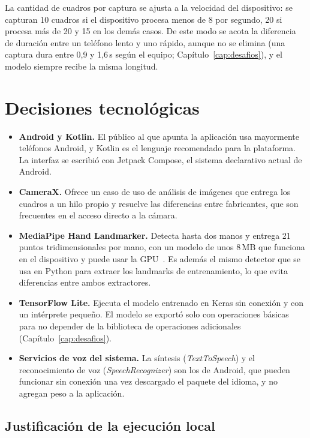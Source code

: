 La cantidad de cuadros por captura se ajusta a la velocidad del dispositivo: se capturan 10 cuadros si el dispositivo procesa menos de 8 por segundo, 20 si procesa más de 20 y 15 en los demás casos. De este modo se acota la diferencia de duración entre un teléfono lento y uno rápido, aunque no se elimina (una captura dura entre 0,9 y 1,6\,s según el equipo; Capítulo~\ref{cap:desafios}), y el modelo siempre recibe la misma longitud.

\section{Decisiones tecnológicas}

\begin{itemize}
    \item \textbf{Android y Kotlin.} El público al que apunta la aplicación usa mayormente teléfonos Android, y Kotlin es el lenguaje recomendado para la plataforma. La interfaz se escribió con Jetpack Compose, el sistema declarativo actual de Android.
    \item \textbf{CameraX.} Ofrece un caso de uso de análisis de imágenes que entrega los cuadros a un hilo propio y resuelve las diferencias entre fabricantes, que son frecuentes en el acceso directo a la cámara.
    \item \textbf{MediaPipe Hand Landmarker.} Detecta hasta dos manos y entrega 21 puntos tridimensionales por mano, con un modelo de unos 8\,MB que funciona en el dispositivo y puede usar la GPU~\cite{zhang2020mediapipehands}. Es además el mismo detector que se usa en Python para extraer los landmarks de entrenamiento, lo que evita diferencias entre ambos extractores.
    \item \textbf{TensorFlow Lite.} Ejecuta el modelo entrenado en Keras sin conexión y con un intérprete pequeño. El modelo se exportó solo con operaciones básicas para no depender de la biblioteca de operaciones adicionales (Capítulo~\ref{cap:desafios}).
    \item \textbf{Servicios de voz del sistema.} La síntesis (\emph{TextToSpeech}) y el reconocimiento de voz (\emph{SpeechRecognizer}) son los de Android, que pueden funcionar sin conexión una vez descargado el paquete del idioma, y no agregan peso a la aplicación.
\end{itemize}

\subsection{Justificación de la ejecución local}

